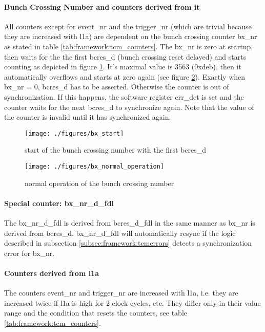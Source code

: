 \paragraph{Bunch Crossing Number and counters derived from it}
All counters except for event\_nr and the trigger\_nr (which are trivial because they are increased with l1a) are dependent on the bunch crossing counter bx\_nr as stated in table \ref{tab:framework:tcm_counters}. The bx\_nr is zero at startup, then waits for the the first bcres\_d (bunch crossing reset delayed) and starts counting as depicted in figure \ref{fig:bx_start}. It's maximal value is 3563 (0xdeb), then it automatically overflows and starts at zero again (see figure \ref{fig:bx_normal_operation}). Exactly when bx\_nr = 0, bcres\_d has to be asserted. Otherwise the counter is out of synchronization. If this happens, the software register err\_det is set and the counter waits for the next bcres\_d to synchronize again. Note that the value of the counter is invalid until it has synchronized again.

\begin{figure}[ht]
  \texttt{[image: ./figures/bx\_start]}
  \caption{start of the bunch crossing number with the first bcres\_d}
  \label{fig:bx_start}
\end{figure}

\begin{figure}[ht]
  \texttt{[image: ./figures/bx\_normal\_operation]}
  \caption{normal operation of the bunch crossing number}
  \label{fig:bx_normal_operation}
\end{figure}

\paragraph{Special counter: bx\_nr\_d\_fdl}
The bx\_nr\_d\_fdl is derived from bcres\_d\_fdl in the same manner as bx\_nr is derived from bcres\_d. bx\_nr\_d\_fdl will automatically resync if the logic described in subsection \ref{subsec:framework:tcmerrors} detects a synchronization error for bx\_nr.

\paragraph{Counters derived from l1a}
The counters event\_nr and trigger\_nr are increased with l1a, i.e. they are increased twice if l1a is high for 2 clock cycles, etc. They differ only in their value range and the condition that resets the counters, see table \ref{tab:framework:tcm_counters}.

